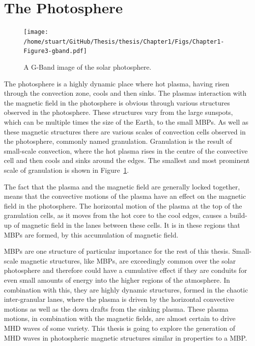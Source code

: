 \documentclass[a4paper,12pt,fourier,authoryear,custommargin]{Classes/PhDThesisPSnPDF}
\begin{document}
\section{The Photosphere} 



\begin{figure}[h]
    \centering
    \texttt{[image: /home/stuart/GitHub/Thesis/thesis/Chapter1/Figs/Chapter1-Figure3-gband.pdf]}
    \caption{A G-Band image of the solar photosphere.}
    \label{fig:gband}
\end{figure}

The photosphere is a highly dynamic place where hot plasma, having risen through the convection zone, cools and then sinks.
The plasmas interaction with the magnetic field in the photosphere is obvious through various structures observed in the photosphere.
These structures vary from the large sunspots, which can be multiple times the size of the Earth, to the small MBPs. %
As well as these magnetic structures there are various scales of convection cells observed in the photosphere, commonly named granulation.
Granulation is the result of small-scale convection, where the hot plasma rises in the centre of the convective cell and then cools and sinks around the edges.
The smallest and most prominent scale of granulation is shown in Figure~\ref{fig:gband}.

The fact that the plasma and the magnetic field are generally locked together, means that the convective motions of the plasma have an effect on the magnetic field in the photosphere.
The horizontal motion of the plasma at the top of the granulation cells, as it moves from the hot core to the cool edges, causes a build-up of magnetic field in the lanes between these cells.
It is in these regions that MBPs are formed, by this accumulation of magnetic field. \citep{shelyag2004,keys2013}

MBPs are one structure of particular importance for the rest of this thesis.
Small-scale magnetic structures, like MBPs, are exceedingly common over the solar photosphere and therefore could have a cumulative effect if they are conduits for even small amounts of energy into the higher regions of the atmosphere.
In combination with this, they are highly dynamic structures, formed in the chaotic inter-granular lanes, where the plasma is driven by the horizontal convective motions as well as the down drafts from the sinking plasma.
These plasma motions, in combination with the magnetic fields, are almost certain to drive MHD waves of some variety. 
This thesis is going to explore the generation of MHD waves in photospheric magnetic structures similar in properties to a MBP.
\end{document}
